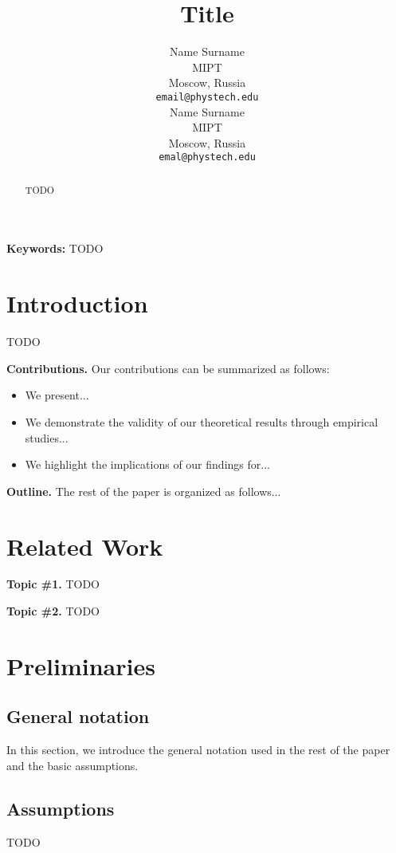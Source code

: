 \documentclass{article}
\title{Title}
\author{
  Name Surname\\
  MIPT\\
  Moscow, Russia\\
  \texttt{email@phystech.edu}\\
  \And
  Name Surname\\
  MIPT\\
  Moscow, Russia\\
  \texttt{emal@phystech.edu}\\
}
\begin{document}
\maketitle

\begin{abstract}
    TODO
\end{abstract}

\textbf{Keywords:} TODO

\section{Introduction}\label{sec:intro}

TODO

\textbf{Contributions.} Our contributions can be summarized as follows:
\begin{itemize}
    \item We present...
    \item We demonstrate the validity of our theoretical results through empirical studies...
    \item We highlight the implications of our findings for...
\end{itemize}

\textbf{Outline.} The rest of the paper is organized as follows...

\section{Related Work}\label{sec:rw}

\textbf{Topic \#1.}
TODO

\textbf{Topic \#2.}
TODO

\section{Preliminaries}\label{sec:prelim}

\subsection{General notation}

In this section, we introduce the general notation used in the rest of the paper and the basic assumptions. 

\subsection{Assumptions} 

TODO
\end{document}
